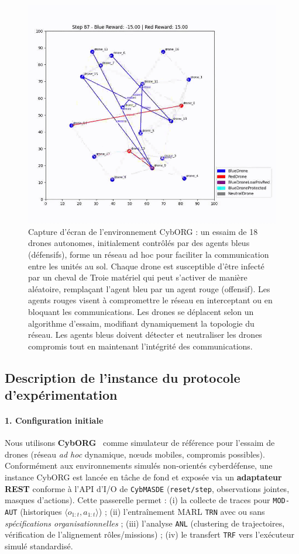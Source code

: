 \begin{figure}[h!]
  \centering
  \includegraphics[trim=0cm 1cm 0cm 1cm, clip, width=0.6\linewidth]{figures/cyborg.png}
  \caption{Capture d'écran de l'environnement CybORG : un essaim de 18 drones autonomes, initialement contrôlés par des agents bleus (défensifs), forme un réseau ad hoc pour faciliter la communication entre les unités au sol. Chaque drone est susceptible d'être infecté par un cheval de Troie matériel qui peut s'activer de manière aléatoire, remplaçant l'agent bleu par un agent rouge (offensif). Les agents rouges visent à compromettre le réseau en interceptant ou en bloquant les communications. Les drones se déplacent selon un algorithme d'essaim, modifiant dynamiquement la topologie du réseau. Les agents bleus doivent détecter et neutraliser les drones compromis tout en maintenant l'intégrité des communications.}
  \label{fig:cyborg}
\end{figure}

\subsection{Description de l'instance du protocole d'expérimentation}

\paragraph{1. Configuration initiale}

Nous utilisons \textbf{CybORG}~\cite{Standen2021} comme simulateur de référence pour l'essaim de drones (réseau \textit{ad hoc} dynamique, nœuds mobiles, compromis possibles). Conformément aux environnements simulés non-orientés cyberdéfense, une instance CybORG est lancée en tâche de fond et exposée via un \textbf{adaptateur REST} conforme à l’API d’I/O de \texttt{CybMASDE} (\texttt{reset/step}, observations jointes, masques d’actions). Cette passerelle permet : (i) la collecte de traces pour \texttt{MOD-AUT} (historiques $\langle o_{1:t}, a_{1:t} \rangle$) ; (ii) l’entraînement MARL \texttt{TRN} avec ou sans \textit{spécifications organisationnelles} ; (iii) l’analyse \texttt{ANL} (clustering de trajectoires, vérification de l’alignement rôles/missions) ; (iv) le transfert \texttt{TRF} vers l’exécuteur simulé standardisé.

